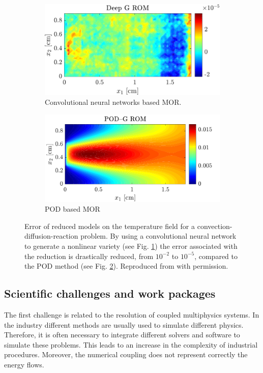 \documentclass[12pt]{article}
\begin{document}
	\begin{figure}[t]
		\begin{subfigure}[t]{0.465\textwidth}
			\includegraphics[width=\columnwidth]{DGROM_T_param1.pdf} 
			\caption{Convolutional neural networks based MOR.}
			\label{fig:DG_ROM}
		\end{subfigure}\hfill
		\begin{subfigure}[t]{0.48\textwidth}
			\includegraphics[width=\columnwidth]{GROM_T_param1.pdf}%
			\caption{POD based MOR}
			\label{fig:POD_ROM}
		\end{subfigure}
		\caption[]{Error of reduced models on the temperature field for a convection-diffusion-reaction problem. By using a convolutional neural network to generate a nonlinear variety (see Fig. \ref{fig:DG_ROM}) the error associated with the reduction is drastically reduced, from $10^{-2}$ to $10^{-5}$, compared to the POD method (see Fig. \ref{fig:POD_ROM}). Reproduced from \cite{lee2020} with permission.}%
		\label{fig:deepROM}%
	\end{figure}
	
	
	\subsection{Scientific challenges and work packages}
	The first challenge is related to the resolution of coupled multiphysics systems.  In the industry different methods are usually used to simulate different physics. Therefore, it is often necessary to integrate different solvers and software to simulate these problems. This leads to an increase in the complexity of industrial procedures. Moreover, the numerical coupling does not represent correctly the energy flows. \\
	
\end{document}
